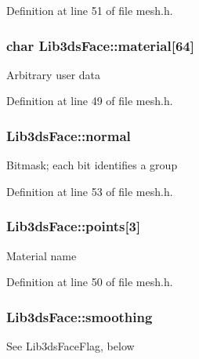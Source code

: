 Definition at line 51 of file mesh.\-h.

\hypertarget{struct_lib3ds_face_a90a36b5382746728de75494e8a3f923b}{
\subsubsection[{material}]{\setlength{\rightskip}{0pt plus 5cm}char Lib3ds\-Face\-::material\mbox{[}64\mbox{]}}}\label{struct_lib3ds_face_a90a36b5382746728de75494e8a3f923b}
Arbitrary user data 

Definition at line 49 of file mesh.\-h.

\hypertarget{struct_lib3ds_face_a6a161cba0c8e3fed5799fac0126fe8c3}{
\subsubsection[{normal}]{ Lib3ds\-Face\-::normal}}\label{struct_lib3ds_face_a6a161cba0c8e3fed5799fac0126fe8c3}
Bitmask; each bit identifies a group 

Definition at line 53 of file mesh.\-h.

\hypertarget{struct_lib3ds_face_a8442b94dd05fb4825de5b8eafcb32d57}{
\subsubsection[{points}]{ Lib3ds\-Face\-::points\mbox{[}3\mbox{]}}}\label{struct_lib3ds_face_a8442b94dd05fb4825de5b8eafcb32d57}
Material name 

Definition at line 50 of file mesh.\-h.

\hypertarget{struct_lib3ds_face_afcaec6a7c5f1cdcf3949c28ca8de3ddc}{
\subsubsection[{smoothing}]{ Lib3ds\-Face\-::smoothing}}\label{struct_lib3ds_face_afcaec6a7c5f1cdcf3949c28ca8de3ddc}
See Lib3ds\-Face\-Flag, below 

